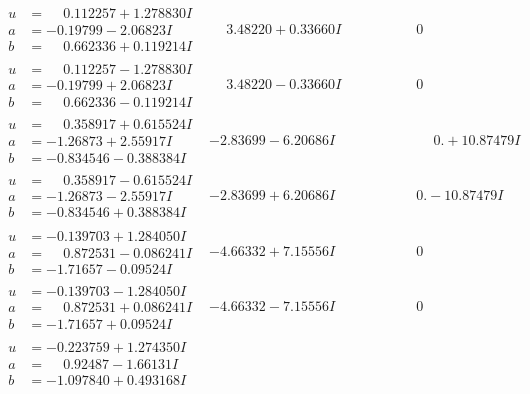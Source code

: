 \documentclass[1p]{elsarticle_modified}
\theoremstyle{definition}
\begin{document}
$$\begin{array}{c|c|c}
\begin{aligned}
u &= \phantom{-}0.112257 + 1.278830 I \\
a &= -0.19799 - 2.06823 I \\
b &= \phantom{-}0.662336 + 0.119214 I\end{aligned}
 & \phantom{-}3.48220 + 0.33660 I & \phantom{-0.000000 } 0 \\ \hline\begin{aligned}
u &= \phantom{-}0.112257 - 1.278830 I \\
a &= -0.19799 + 2.06823 I \\
b &= \phantom{-}0.662336 - 0.119214 I\end{aligned}
 & \phantom{-}3.48220 - 0.33660 I & \phantom{-0.000000 } 0 \\ \hline\begin{aligned}
u &= \phantom{-}0.358917 + 0.615524 I \\
a &= -1.26873 + 2.55917 I \\
b &= -0.834546 - 0.388384 I\end{aligned}
 & -2.83699 - 6.20686 I & \phantom{-0.000000 -}0. + 10.87479 I \\ \hline\begin{aligned}
u &= \phantom{-}0.358917 - 0.615524 I \\
a &= -1.26873 - 2.55917 I \\
b &= -0.834546 + 0.388384 I\end{aligned}
 & -2.83699 + 6.20686 I & \phantom{-0.000000 } 0. - 10.87479 I \\ \hline\begin{aligned}
u &= -0.139703 + 1.284050 I \\
a &= \phantom{-}0.872531 - 0.086241 I \\
b &= -1.71657 - 0.09524 I\end{aligned}
 & -4.66332 + 7.15556 I & \phantom{-0.000000 } 0 \\ \hline\begin{aligned}
u &= -0.139703 - 1.284050 I \\
a &= \phantom{-}0.872531 + 0.086241 I \\
b &= -1.71657 + 0.09524 I\end{aligned}
 & -4.66332 - 7.15556 I & \phantom{-0.000000 } 0 \\ \hline\begin{aligned}
u &= -0.223759 + 1.274350 I \\
a &= \phantom{-}0.92487 - 1.66131 I \\
b &= -1.097840 + 0.493168 I\end{aligned}

\end{array}$$
\end{document}
